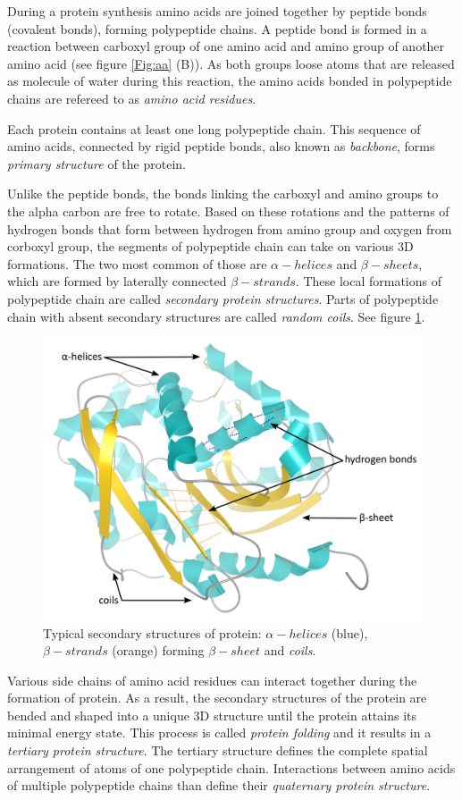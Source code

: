 During a protein synthesis amino acids are joined together by peptide bonds (covalent bonds), forming polypeptide chains. A peptide bond is formed in a reaction between carboxyl group of one amino acid and amino group of another amino acid (see figure \ref{Fig:aa} (B)). As both groups loose atoms that are released as molecule of water during this reaction, the amino acids bonded in polypeptide chains are refereed to as \textit{amino acid residues}. 

Each protein contains at least one long polypeptide chain. This sequence of amino acids, connected by rigid peptide bonds, also known as \textit{backbone}, forms \textit{primary structure} of the protein.

Unlike the peptide bonds, the bonds linking the carboxyl and amino groups to the alpha carbon are free to rotate. Based on these rotations and the patterns of hydrogen bonds that form between hydrogen from amino group and oxygen from corboxyl group, the segments of polypeptide chain can take on various 3D formations. The two most common of those are $\alpha-helices$ and $\beta-sheets$, which are formed by laterally connected $\beta-strands$. These local formations of polypeptide chain are called \textit{secondary protein structures}. Parts of polypeptide chain with absent secondary structures are called \textit{random coils}. See figure \ref{Fig:secondary}.

\begin{figure}[H]
  \centering
  \includegraphics[width=.6\textwidth]{pictures/secondary.pdf} 
  \caption{Typical secondary structures of protein: $\alpha-helices$ (blue), $\beta-strands$ (orange) forming $\beta-sheet$ and \textit{coils}.}
  \label{Fig:secondary}
\end{figure} 

Various side chains of amino acid residues can interact together during the formation of protein. As a result, the secondary structures of the protein are bended and shaped into a  unique 3D structure until the protein attains its minimal energy state. This process is called \textit{protein folding} and it results in a \textit{tertiary protein structure}. The tertiary structure defines the complete spatial arrangement of atoms of one polypeptide chain. Interactions between amino acids of multiple polypeptide chains than define their \textit{quaternary protein structure}.

